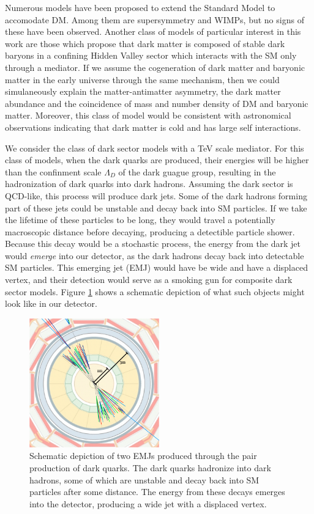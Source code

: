 Numerous models have been proposed to extend the Standard Model to accomodate DM. Among them are supersymmetry and WIMPs, but no signs of these have been observed. Another class of models of particular interest in this work are those which propose that dark matter is composed of stable dark baryons in a confining Hidden Valley sector which interacts with the SM only through a mediator. If we assume the cogeneration of dark matter and baryonic matter in the early universe through the same mechanism, then we could simulaneously explain the matter-antimatter asymmetry, the dark matter abundance and the coincidence of mass and number density of DM and baryonic matter. Moreover, this class of model would be consistent with astronomical observations indicating that dark matter is cold and has large self interactions.

We consider the class of dark sector models with a TeV scale mediator. For this class of models, when the dark quarks are produced, their energies will be higher than the confinment scale $\Lambda_D$ of the dark guague group, resulting in the hadronization of dark quarks into dark hadrons. Assuming the dark sector is QCD-like, this process will produce dark jets. Some of the dark hadrons forming part of these jets could be unstable and decay back into SM particles. If we take the lifetime of these particles to be long, they would travel a potentially macroscopic distance before decaying, producing a detectible particle shower. Because this decay would be a stochastic process, the energy from the dark jet would \textit{emerge} into our detector, as the dark hadrons decay back into detectable SM particles. This emerging jet (EMJ) would have be wide and have a displaced vertex, and their detection would serve as a smoking gun for composite dark sector models. Figure \ref{fig:emj} shows a schematic depiction of what such objects might look like in our detector.

\begin{figure}[h]
	\centering
	\includegraphics[width=0.5\textwidth]{images/emj.png}
	\caption{Schematic depiction of two EMJs produced through the pair production of dark quarks. The dark quarks hadronize into dark hadrons, some of which are unstable and decay back into SM particles after some distance. The energy from these decays emerges into the detector, producing a wide jet with a displaced vertex.}
	\label{fig:emj}
\end{figure}

